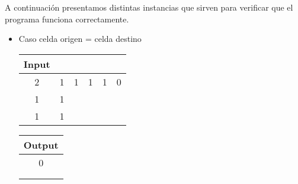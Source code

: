 \documentclass[11pt, a4paper, twoside]{article}
\begin{document}
{}
A continuación presentamos distintas instancias que sirven para verificar que el programa funciona correctamente.\\

\begin{itemize}
\item Caso celda origen = celda destino \\
	 \begin{minipage}{0.4\textwidth}
		\begin{tabular}{cccccc}
		   Input \\
		   \hline
		   2 & 1 & 1& 1 & 1 & 0\\
		   1 & 1 &  &   &   &  \\
		   1 & 1 &  &   &   &  \\
		\end{tabular}
	\end{minipage} 
		\begin{minipage}{0.2\textwidth}
			\begin{tabular}{c}
			   Output \\
			   \hline
			   0 \\
				 \\
				 \\
		\end{tabular}
	\end{minipage} 


\end{itemize}
\end{document}
